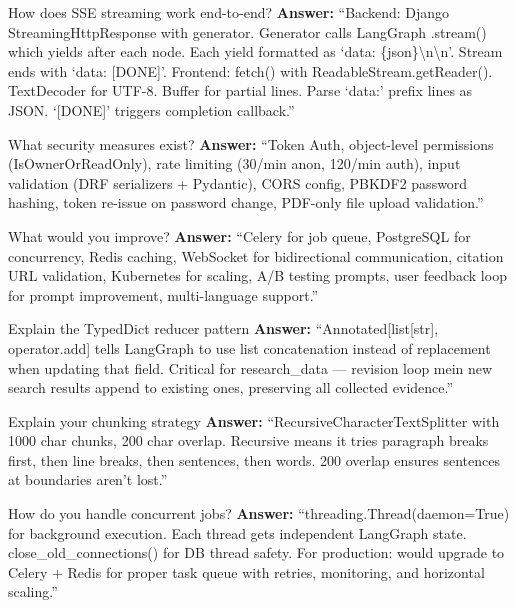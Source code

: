 \documentclass[11pt,a4paper,twoside]{report}
\begin{document}
\begin{interviewbox}{How does SSE streaming work end-to-end?}
\textbf{Answer:} ``Backend: Django StreamingHttpResponse with generator. Generator calls LangGraph .stream() which yields after each node. Each yield formatted as `data: \{json\}\textbackslash n\textbackslash n'. Stream ends with `data: [DONE]'. Frontend: fetch() with ReadableStream.getReader(). TextDecoder for UTF-8. Buffer for partial lines. Parse `data:' prefix lines as JSON. `[DONE]' triggers completion callback.''
\end{interviewbox}

\begin{interviewbox}{What security measures exist?}
\textbf{Answer:} ``Token Auth, object-level permissions (IsOwnerOrReadOnly), rate limiting (30/min anon, 120/min auth), input validation (DRF serializers + Pydantic), CORS config, PBKDF2 password hashing, token re-issue on password change, PDF-only file upload validation.''
\end{interviewbox}

\begin{interviewbox}{What would you improve?}
\textbf{Answer:} ``Celery for job queue, PostgreSQL for concurrency, Redis caching, WebSocket for bidirectional communication, citation URL validation, Kubernetes for scaling, A/B testing prompts, user feedback loop for prompt improvement, multi-language support.''
\end{interviewbox}

\begin{interviewbox}{Explain the TypedDict reducer pattern}
\textbf{Answer:} ``Annotated[list[str], operator.add] tells LangGraph to use list concatenation instead of replacement when updating that field. Critical for research\_data --- revision loop mein new search results append to existing ones, preserving all collected evidence.''
\end{interviewbox}

\begin{interviewbox}{Explain your chunking strategy}
\textbf{Answer:} ``RecursiveCharacterTextSplitter with 1000 char chunks, 200 char overlap. Recursive means it tries paragraph breaks first, then line breaks, then sentences, then words. 200 overlap ensures sentences at boundaries aren't lost.''
\end{interviewbox}

\begin{interviewbox}{How do you handle concurrent jobs?}
\textbf{Answer:} ``threading.Thread(daemon=True) for background execution. Each thread gets independent LangGraph state. close\_old\_connections() for DB thread safety. For production: would upgrade to Celery + Redis for proper task queue with retries, monitoring, and horizontal scaling.''
\end{interviewbox}
\end{document}
